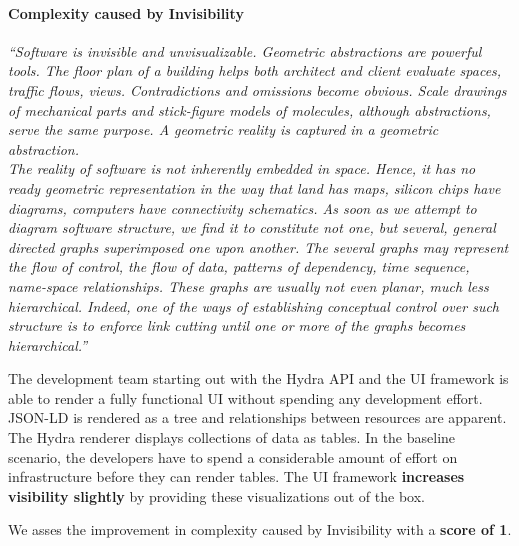 \paragraph{Complexity caused by Invisibility}
\textit{``Software is invisible and unvisualizable. Geometric abstractions are powerful tools. The floor plan of a building helps both architect and client evaluate spaces, traffic flows, views. Contradictions and omissions become obvious. Scale drawings of mechanical parts and stick-figure models of molecules, although abstractions, serve the same purpose. A geometric reality is captured in a geometric abstraction. \\ The reality of software is not inherently embedded in space. Hence, it has no ready geometric representation in the way that land has maps, silicon chips have diagrams, computers have connectivity schematics. As soon as we attempt to diagram software structure, we find it to constitute not one, but several, general directed graphs superimposed one upon another. The several graphs may represent the flow of control, the flow of data, patterns of dependency, time sequence, name-space relationships. These graphs are usually not even planar, much less hierarchical. Indeed, one of the ways of establishing conceptual control over such structure is to enforce link cutting until one or more of the graphs becomes hierarchical.''} \citep[p.~4]{nosilverbullet}

The development team starting out with the Hydra API and the UI framework is able to render a fully functional UI without spending any development effort. JSON-LD is rendered as a tree and relationships between resources are apparent. The Hydra renderer displays collections of data as tables. In the baseline scenario, the developers have to spend a considerable amount of effort on infrastructure before they can render tables. The UI framework \textbf{increases visibility slightly} by providing these visualizations out of the box.

We asses the improvement in complexity caused by Invisibility with a \textbf{score of 1}.

